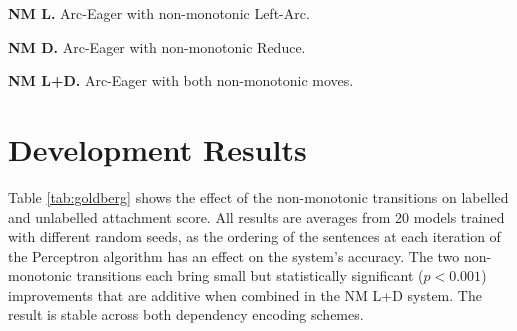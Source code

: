 \documentclass[11pt,letterpaper]{article}
\begin{document}
\noindent\textbf{NM L.} Arc-Eager with non-monotonic Left-Arc.

\noindent\textbf{NM D.} Arc-Eager with non-monotonic Reduce.

\noindent\textbf{NM L+D.} Arc-Eager with both non-monotonic moves.

\section{Development Results}
\label{sec:results}

Table \ref{tab:goldberg} shows the effect of the non-monotonic transitions on
labelled and unlabelled attachment score. All results are averages from 20 models
trained with different random seeds, as the ordering of the sentences at each iteration
of the Perceptron algorithm has an effect on the system's accuracy.
The two non-monotonic transitions each bring small but statistically significant
($p < 0.001$) improvements that are additive when combined in the NM L+D system.
The result is stable across both dependency encoding schemes.

\end{document}
